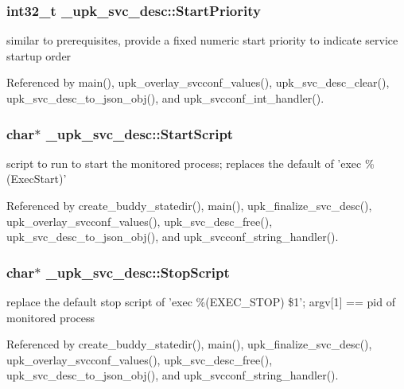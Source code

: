 \subsubsection[{StartPriority}]{\setlength{\rightskip}{0pt plus 5cm}int32\_\-t {\bf \_\-upk\_\-svc\_\-desc::StartPriority}}\label{struct__upk__svc__desc_a9eb636044a78073721e6f021067f5581}
similar to prerequisites, provide a fixed numeric start priority to indicate service startup order 

Referenced by main(), upk\_\-overlay\_\-svcconf\_\-values(), upk\_\-svc\_\-desc\_\-clear(), upk\_\-svc\_\-desc\_\-to\_\-json\_\-obj(), and upk\_\-svcconf\_\-int\_\-handler().

\subsubsection[{StartScript}]{\setlength{\rightskip}{0pt plus 5cm}char$\ast$ {\bf \_\-upk\_\-svc\_\-desc::StartScript}}\label{struct__upk__svc__desc_a73b69e8c9ad7d2d52999d6efcbb818fe}
script to run to start the monitored process; replaces the default of 'exec \%(ExecStart)' 

Referenced by create\_\-buddy\_\-statedir(), main(), upk\_\-finalize\_\-svc\_\-desc(), upk\_\-overlay\_\-svcconf\_\-values(), upk\_\-svc\_\-desc\_\-free(), upk\_\-svc\_\-desc\_\-to\_\-json\_\-obj(), and upk\_\-svcconf\_\-string\_\-handler().

\subsubsection[{StopScript}]{\setlength{\rightskip}{0pt plus 5cm}char$\ast$ {\bf \_\-upk\_\-svc\_\-desc::StopScript}}\label{struct__upk__svc__desc_a229ce0ff9aaf9e89552c53a71e7a6181}
replace the default stop script of 'exec \%(EXEC\_\-STOP) \$1'; argv[1] == pid of monitored process 

Referenced by create\_\-buddy\_\-statedir(), main(), upk\_\-finalize\_\-svc\_\-desc(), upk\_\-overlay\_\-svcconf\_\-values(), upk\_\-svc\_\-desc\_\-free(), upk\_\-svc\_\-desc\_\-to\_\-json\_\-obj(), and upk\_\-svcconf\_\-string\_\-handler().

